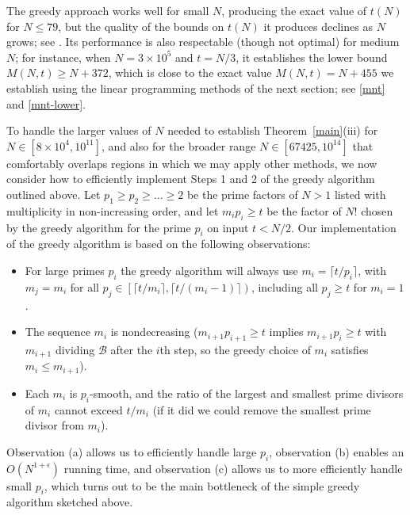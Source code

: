 \documentclass[10pt,a4paper,reqno]{amsart}
\numberwithin{equation}{section}
\theoremstyle{plain}
\theoremstyle{definition}
\newcommand\tuple{{\mathcal B}}
\begin{document}
The greedy approach works well for small $N$, producing the exact value of $t(N)$ for $N \leq 79$, but the quality of the bounds on $t(N)$ it produces declines as $N$ grows; see .  Its performance is also respectable (though not optimal) for medium $N$; for instance, when $N=3 \times 10^5$ and $t=N/3$, it establishes the lower bound $M(N,t) \geq N+372$, which is close to the exact value $M(N,t) = N+455$ we establish using the linear programming methods of the next section; see \eqref{mnt} and \eqref{mnt-lower}.

To handle the larger values of $N$ needed to establish Theorem~\ref{main}(iii) for $N\in [ 8\times 10^4, 10^{11}]$, and also for the broader range $N\in [67425,10^{14}]$ that comfortably overlaps regions in which we may apply other methods, we now consider how to efficiently implement Steps 1 and 2 of the greedy algorithm outlined above.  Let $p_1\ge p_2\ge \ldots \ge 2$ be the prime factors of $N>1$ listed with multiplicity in non-increasing order, and let $m_ip_i\ge t$ be the factor of $N!$ chosen by the greedy algorithm for the prime $p_i$ on input $t < N/2$.  Our implementation of the greedy algorithm is based on the following observations:

\begin{itemize}
\item[(a)] For large primes $p_i$ the greedy algorithm will always use $m_i=\lceil t/p_i\rceil$, with $m_j=m_i$ for all $p_j\in \left[\lceil t/m_i\rceil,\lceil t/(m_i-1)\rceil\right)$, including all $p_j\ge t$ for $m_i=1$.
\item[(b)] The sequence $m_i$ is nondecreasing ($m_{i+1}p_{i+1}\ge t$ implies $m_{i+1}p_i\ge t$ with $m_{i+1}$ dividing $\tuple$ after the $i$th step, so the greedy choice of $m_i$ satisfies $m_i\le m_{i+1}$).
\item[(c)] Each $m_i$ is $p_i$-smooth, and the ratio of the largest and smallest prime divisors of $m_i$ cannot exceed $t/m_i$ (if it did we could remove the smallest prime divisor from $m_i$).
\end{itemize}

Observation (a) allows us to efficiently handle large $p_i$, observation (b) enables an $O(N^{1+\epsilon})$ running time, and observation (c) allows us to more efficiently handle small $p_i$, which turns out to be the main bottleneck of the simple greedy algorithm sketched above.
\end{document}
